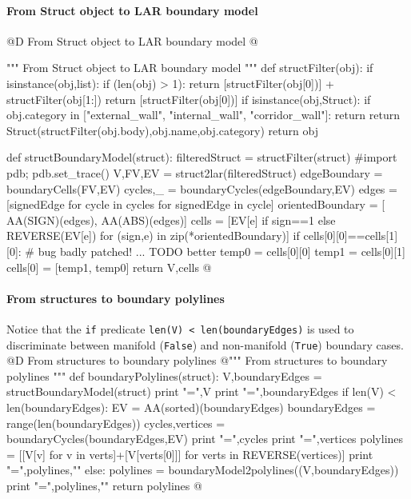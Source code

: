 \documentclass[11pt,oneside]{article}	%
\begin{document}
\paragraph{From Struct object to LAR boundary model}
@D From Struct object to LAR boundary model
@{""" From Struct object to LAR boundary model """
def structFilter(obj):
    if isinstance(obj,list):
        if (len(obj) > 1):
            return [structFilter(obj[0])] + structFilter(obj[1:])
        return [structFilter(obj[0])]
    if isinstance(obj,Struct):
        if obj.category in ["external_wall", "internal_wall", "corridor_wall"]:
            return
        return Struct(structFilter(obj.body),obj.name,obj.category)
    return obj

def structBoundaryModel(struct):
    filteredStruct = structFilter(struct)
    #import pdb; pdb.set_trace()
    V,FV,EV = struct2lar(filteredStruct)
    edgeBoundary = boundaryCells(FV,EV)
    cycles,_ = boundaryCycles(edgeBoundary,EV)
    edges = [signedEdge for cycle in cycles for signedEdge in cycle]
    orientedBoundary = [ AA(SIGN)(edges), AA(ABS)(edges)]
    cells = [EV[e] if sign==1 else REVERSE(EV[e]) for (sign,e) in zip(*orientedBoundary)]
    if cells[0][0]==cells[1][0]: # bug badly patched! ... TODO better
        temp0 = cells[0][0]
        temp1 = cells[0][1]
        cells[0] = [temp1, temp0]
    return V,cells
@}



\paragraph{From structures to boundary polylines}
Notice that the \texttt{if} predicate \texttt{len(V) < len(boundaryEdges)} 
is used to discriminate between manifold (\texttt{False}) and non-manifold (\texttt{True})
boundary cases.
@D From structures to boundary polylines
@{""" From structures to boundary polylines """
def boundaryPolylines(struct):
    V,boundaryEdges = structBoundaryModel(struct)
    print "\nV =",V
    print "\nboundaryEdges =",boundaryEdges
    if len(V) < len(boundaryEdges):
        EV = AA(sorted)(boundaryEdges)
        boundaryEdges = range(len(boundaryEdges))
        cycles,vertices = boundaryCycles(boundaryEdges,EV)
        print "\ncycles =",cycles
        print "\nvertices =",vertices
        polylines = [[V[v] for v in verts]+[V[verts[0]]] for verts in REVERSE(vertices)]
        print "\npolylines =",polylines,"\n"
    else:
        polylines = boundaryModel2polylines((V,boundaryEdges))
    print "\npolylines =",polylines,"\n"
    return polylines
@}
\end{document}
